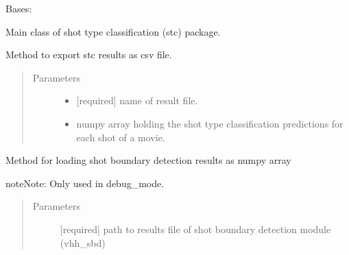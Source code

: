 \documentclass[letterpaper,10pt,english,openany,oneside]{sphinxmanual}
\begin{document}
\begin{fulllineitems}
\label{\detokenize{STC:stc.STC.STC}}
Bases: 

Main class of shot type classification (stc) package.

\begin{fulllineitems}
\label{\detokenize{STC:stc.STC.STC.exportStcResults}}
Method to export stc results as csv file.
\begin{quote}\begin{description}
\item[{Parameters}] \leavevmode\begin{itemize}
\item {} 
 \textendash{} {[}required{]} name of result file.

\item {} 
 \textendash{} numpy array holding the shot type classification predictions for each shot of a movie.

\end{itemize}

\end{description}\end{quote}

\end{fulllineitems}


\begin{fulllineitems}
\label{\detokenize{STC:stc.STC.STC.loadSbdResults}}
Method for loading shot boundary detection results as numpy array

\begin{sphinxadmonition}{note}{Note:}
Only used in debug\_mode.
\end{sphinxadmonition}
\begin{quote}\begin{description}
\item[{Parameters}] \leavevmode
{} \textendash{} {[}required{]} path to results file of shot boundary detection module (vhh\_sbd)


\end{description}
\end{quote}
\end{fulllineitems}
\end{fulllineitems}
\end{document}

